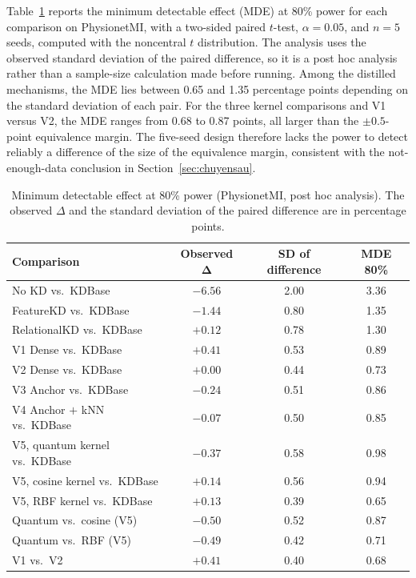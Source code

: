 Table~\ref{tab:mde} reports the minimum detectable effect (MDE) at 80\%
power for each comparison on PhysionetMI, with a two-sided paired $t$-test,
$\alpha = 0.05$, and $n = 5$ seeds, computed with the noncentral $t$
distribution. The analysis uses the observed standard deviation of the paired
difference, so it is a post hoc analysis rather than a sample-size calculation
made before running. Among the distilled mechanisms, the MDE lies between
0.65 and 1.35 percentage points depending on the standard deviation of
each pair. For the three kernel
comparisons and V1 versus V2, the MDE ranges from 0.68 to 0.87 points, all
larger than the $\pm 0.5$-point equivalence margin. The five-seed design
therefore lacks the power to detect reliably a difference of the size of the
equivalence margin, consistent with the not-enough-data conclusion in
Section~\ref{sec:chuyensau}.

\begin{table}[!htbp]
\centering
\caption{Minimum detectable effect at 80\% power (PhysionetMI, post hoc analysis). The observed $\Delta$ and the standard deviation of the paired difference are in percentage points.}
\label{tab:mde}
\small
\begin{tabular}{lccc}
\toprule
\textbf{Comparison} & \textbf{Observed} $\boldsymbol{\Delta}$ & \textbf{SD of difference} & \textbf{MDE 80\%} \\
\midrule
No KD vs.\ KDBase & $-6.56$ & 2.00 & 3.36 \\
FeatureKD vs.\ KDBase & $-1.44$ & 0.80 & 1.35 \\
RelationalKD vs.\ KDBase & $+0.12$ & 0.78 & 1.30 \\
V1 Dense vs.\ KDBase & $+0.41$ & 0.53 & 0.89 \\
V2 Dense vs.\ KDBase & $+0.00$ & 0.44 & 0.73 \\
V3 Anchor vs.\ KDBase & $-0.24$ & 0.51 & 0.86 \\
V4 Anchor $+$ kNN vs.\ KDBase & $-0.07$ & 0.50 & 0.85 \\
V5, quantum kernel vs.\ KDBase & $-0.37$ & 0.58 & 0.98 \\
V5, cosine kernel vs.\ KDBase & $+0.14$ & 0.56 & 0.94 \\
V5, RBF kernel vs.\ KDBase & $+0.13$ & 0.39 & 0.65 \\
\midrule
Quantum vs.\ cosine (V5) & $-0.50$ & 0.52 & 0.87 \\
Quantum vs.\ RBF (V5) & $-0.49$ & 0.42 & 0.71 \\
V1 vs.\ V2 & $+0.41$ & 0.40 & 0.68 \\
\bottomrule
\end{tabular}
\end{table}
\FloatBarrier

